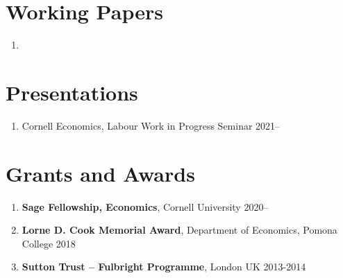 \documentclass[letterpaper,11pt,oneside]{article}
\begin{document}

\section*{Working Papers}
\begin{enumerate}[itemsep=2.5pt, label={}]
    \item {}
\end{enumerate}
 
\section*{Presentations}
\begin{enumerate}[noitemsep, label={}]
    \item Cornell Economics, Labour Work in Progress Seminar 2021--
\end{enumerate}

\section*{Grants and Awards}
\begin{enumerate}[itemsep=2pt, label={}]
    \item \textbf{Sage Fellowship, Economics}, Cornell University 2020--
    \item \textbf{Lorne D. Cook Memorial Award}, Department of Economics, Pomona College 2018
    \item \textbf{Sutton Trust -- Fulbright Programme}, London UK 2013-2014  
\end{enumerate}
\end{document}
